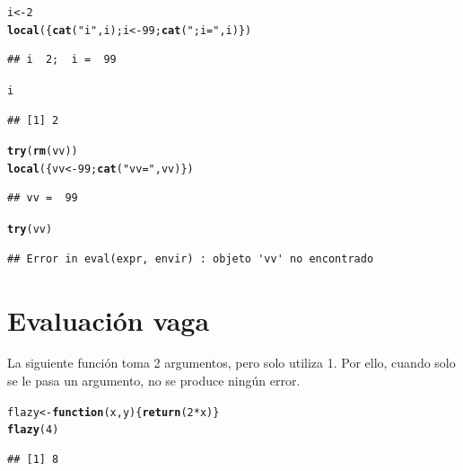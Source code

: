 \documentclass{config/apuntes}\usepackage[]{graphicx}\usepackage[]{xcolor}
\makeatletter
\newcommand{\hlnum}[1]{\textcolor[rgb]{0.686,0.059,0.569}{#1}}%
\newcommand{\hlsng}[1]{\textcolor[rgb]{0.192,0.494,0.8}{#1}}%
\newcommand{\hlopt}[1]{\textcolor[rgb]{0,0,0}{#1}}%
\newcommand{\hldef}[1]{\textcolor[rgb]{0.345,0.345,0.345}{#1}}%
\newcommand{\hlkwa}[1]{\textcolor[rgb]{0.161,0.373,0.58}{\textbf{#1}}}%
\newcommand{\hlkwb}[1]{\textcolor[rgb]{0.69,0.353,0.396}{#1}}%
\newcommand{\hlkwc}[1]{\textcolor[rgb]{0.333,0.667,0.333}{#1}}%
\newcommand{\hlkwd}[1]{\textcolor[rgb]{0.737,0.353,0.396}{\textbf{#1}}}%
\newenvironment{kframe}{%
 \def\at@end@of@kframe{}%
 \ifinner\ifhmode%
  \def\at@end@of@kframe{\end{minipage}}%
  \begin{minipage}{\columnwidth}%
 \fi\fi%
 \def\FrameCommand##1{\hskip\@totalleftmargin \hskip-\fboxsep
 \colorbox{shadecolor}{##1}\hskip-\fboxsep
     \hskip-\linewidth \hskip-\@totalleftmargin \hskip\columnwidth}%
 \MakeFramed {\advance\hsize-\width
   \@totalleftmargin\z@ \linewidth\hsize
   \@setminipage}}%
 {\par\unskip\endMakeFramed%
 \at@end@of@kframe}
\newenvironment{knitrout}{}{} %
\makeatother
\begin{document}
\begin{knitrout}
\color{fgcolor}\begin{kframe}
\begin{alltt}
\hldef{i} \hlkwb{<-} \hlnum{2}
\hlkwd{local}\hldef{(\{}\hlkwd{cat}\hldef{(}\hlsng{"i "}\hldef{, i); i} \hlkwb{<-} \hlnum{99}\hldef{;} \hlkwd{cat}\hldef{(}\hlsng{";  i = "}\hldef{, i)\})}
\end{alltt}
\begin{verbatim}
## i  2;  i =  99
\end{verbatim}
\begin{alltt}
\hldef{i}
\end{alltt}
\begin{verbatim}
## [1] 2
\end{verbatim}
\begin{alltt}
\hlkwd{try}\hldef{(}\hlkwd{rm}\hldef{(vv))}
\hlkwd{local}\hldef{(\{vv} \hlkwb{<-} \hlnum{99}\hldef{;} \hlkwd{cat}\hldef{(}\hlsng{"vv = "}\hldef{, vv)\})}
\end{alltt}
\begin{verbatim}
## vv =  99
\end{verbatim}
\begin{alltt}
\hlkwd{try}\hldef{(vv)}
\end{alltt}
\begin{verbatim}
## Error in eval(expr, envir) : objeto 'vv' no encontrado
\end{verbatim}
\end{kframe}
\end{knitrout}

\section{Evaluación vaga}
La siguiente función toma 2 argumentos, pero solo utiliza 1. Por ello, cuando solo se le pasa un argumento, no se produce ningún error.
\begin{knitrout}
\color{fgcolor}\begin{kframe}
\begin{alltt}
\hldef{flazy} \hlkwb{<-} \hlkwa{function}\hldef{(}\hlkwc{x}\hldef{,} \hlkwc{y}\hldef{) \{}\hlkwd{return}\hldef{(}\hlnum{2} \hlopt{*} \hldef{x)\}}
\hlkwd{flazy}\hldef{(}\hlnum{4}\hldef{)}
\end{alltt}
\begin{verbatim}
## [1] 8
\end{verbatim}
\end{kframe}
\end{knitrout}
\end{document}
